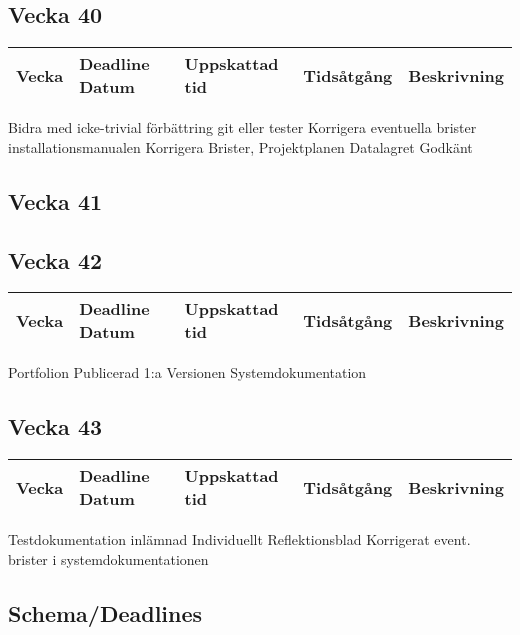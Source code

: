 \documentclass{TDP003mall}
\begin{document}
\subsection{Vecka 40}
\begin{tabular}{|l|l|l|l|l|}
  \hline
  Vecka & Deadline Datum & Uppskattad tid & Tidsåtgång & Beskrivning\\ [0.5ex]
  \hline

  \hline
\end{tabular}
Bidra med icke-trivial förbättring git eller tester
Korrigera eventuella brister installationsmanualen
Korrigera Brister, Projektplanen
Datalagret Godkänt

\subsection{Vecka 41}


\subsection{Vecka 42}
\begin{tabular}{|l|l|l|l|l|}
  \hline
  Vecka & Deadline Datum & Uppskattad tid & Tidsåtgång & Beskrivning\\ [0.5ex]
  \hline

  \hline
\end{tabular}
Portfolion Publicerad
1:a Versionen Systemdokumentation

\subsection{Vecka 43}
\begin{tabular}{|l|l|l|l|l|}
  \hline
  Vecka & Deadline Datum & Uppskattad tid & Tidsåtgång & Beskrivning\\ [0.5ex]
  \hline

  \hline
\end{tabular}
Testdokumentation inlämnad
Individuellt Reflektionsblad
Korrigerat event. brister i systemdokumentationen


\subsection{Schema/Deadlines}
\end{document}

